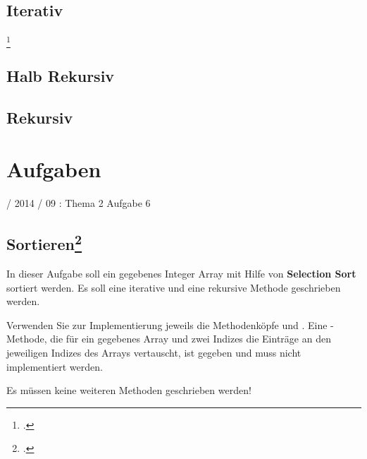 \documentclass{lehramt-informatik-haupt}
\begin{document}
\section{Iterativ}

\footcite[Seite 128 (PDF 146)]{saake}

\section{Halb Rekursiv}


\section{Rekursiv}



\chapter{Aufgaben}

%

 / 2014 / 09 : Thema 2 Aufgabe 6

%

\section{Sortieren\footcite[Aufgabe 2]{aud:e-klausur}}

In dieser Aufgabe soll ein gegebenes Integer Array mit Hilfe von
\textbf{Selection Sort} sortiert werden. Es soll eine iterative und eine
rekursive Methode geschrieben werden.

Verwenden Sie zur Implementierung jeweils die Methodenköpfe
 und . Eine
-Methode, die für ein gegebenes Array und zwei Indizes die
Einträge an den jeweiligen Indizes des Arrays vertauscht, ist gegeben
und muss nicht implementiert werden.

Es müssen keine weiteren Methoden geschrieben werden!

\begin{antwort}



\end{antwort}


\literatur
\end{document}

